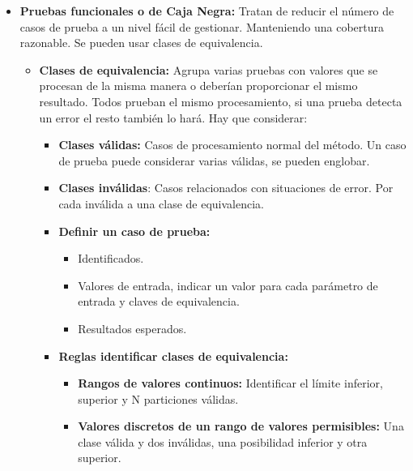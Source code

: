 \documentclass[12pt, twoside, openright]{report} %
\begin{document}
\begin{itemize}
\item \textbf{Pruebas funcionales o de Caja Negra:} Tratan de reducir el
  número de casos de prueba a un nivel fácil de gestionar. Manteniendo
  una cobertura razonable. Se pueden usar clases de equivalencia.
  

  \begin{itemize}
  \item \textbf{Clases de equivalencia:} Agrupa varias pruebas con valores
    que se procesan de la misma manera o deberían proporcionar el mismo
    resultado. Todos prueban el mismo procesamiento, si una prueba
    detecta un error el resto también lo hará. Hay que considerar:
    

    \begin{itemize}
    \item \textbf{Clases válidas:} Casos de procesamiento normal del método.
      Un caso de prueba puede considerar varias válidas, se pueden
      englobar.
      
    \item \textbf{Clases inválidas}: Casos relacionados con situaciones de
      error. Por cada inválida a una clase de equivalencia.
      
    \item \textbf{Definir un caso de prueba:}
      

      \begin{itemize}
      \item Identificados.
        
      \item Valores de entrada, indicar un valor para cada parámetro de
        entrada y claves de equivalencia.
        
      \item Resultados esperados.
        
      \end{itemize}
    \item \textbf{Reglas identificar clases de equivalencia:}
      

      \begin{itemize}
      \item \textbf{Rangos de valores continuos:} Identificar el límite
        inferior, superior y N particiones válidas.
        
      \item \textbf{Valores discretos de un rango de valores permisibles:}
        Una clase válida y dos inválidas, una posibilidad inferior y
        otra superior.
        

\end{itemize}
\end{itemize}
\end{itemize}
\end{itemize}
\end{document}
